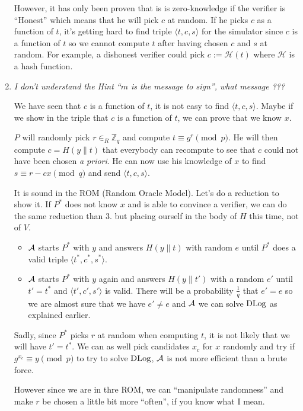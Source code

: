 \begin{solution}
\begin{enumerate}
      However, it has only been proven that is is zero-knowledge
      if the verifier is ``Honest'' which means that he will pick $c$ at random.
      If he picks $c$ as a function of $t$, it's getting hard to find triple $\langle t,c,s \rangle$
      for the simulator since $c$ is a function of $t$ so we cannot compute $t$ after having chosen
      $c$ and $s$ at random.
      For example, a dishonest verifier could pick $c := \mathcal{H}(t)$ where $\mathcal{H}$ is a hash function.
    \item \emph{I don't understand the Hint ``$m$ is the message to sign'', what message ???}

      We have seen that $c$ is a function of $t$,
      it is not easy to find $\langle t,c,s \rangle$.
      Maybe if we show in the triple that $c$ is a function of $t$,
      we can prove that we know $x$.

      $P$ will randomly pick $r \in_R \mathbb{Z}_q$ and compute $t \equiv g^r \pmod{p}$.
      He will then compute $c = H(y\|t)$ that everybody can recompute to see that $c$ could not have been chosen \emph{a priori}.
      He can now use his knowledge of $x$ to find $s \equiv r - cx \pmod{q}$ and send $\langle t, c, s \rangle$.

      It is sound in the ROM (Random Oracle Model).
      Let's do a reduction to show it.
      If $P^*$ does not know $x$ and is able to convince a verifier,
      we can do the same reduction than 3. but placing ourself in the body of $H$ this time, not of $V$.
      \begin{itemize}
        \item $\mathcal{A}$ starts $P^*$ with $y$ and answers $H(y\|t)$ with random $e$ until $P^*$ does a valid triple $\langle t^*,c^*,s^* \rangle$.
        \item $\mathcal{A}$ starts $P^*$ with $y$ again and answers $H(y\|t')$ with a random $e'$ until $t' = t^*$ and $\langle t',c',s' \rangle$ is valid.
          There will be a probability $\frac{1}{q}$ that $e' = e$ so we are almost sure that we have $e' \neq e$
          and $\mathcal{A}$ we can solve $\operatorname{DLog}$ as explained earlier.
      \end{itemize}
      Sadly, since $P^*$ picks $r$ at random when computing $t$, it is not likely that we will have $t' = t^*$.
      We can as well pick candidates $x_c$ for $x$ randomly and try if $g^{x_c} \equiv y \pmod{p}$ to try to solve $\operatorname{DLog}$,
      $\mathcal{A}$ is not more efficient than a brute force.

      However since we are in thre ROM, we can ``manipulate randomness'' and make $r$ be chosen a little bit more ``often'',
      if you know what I mean.
  \end{enumerate}
\end{solution}
